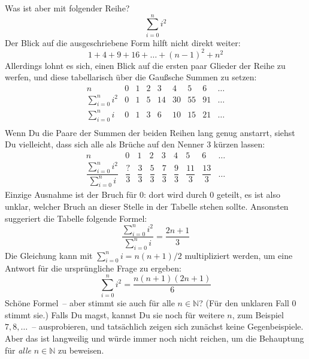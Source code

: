 Was ist aber mit folgender Reihe?
%
\[ \sum_{i=0}^n i^2 \]
%
Der Blick auf die ausgeschriebene Form hilft nicht direkt weiter:
%
\[ 1+4+9+16+\ldots+(n-1)^2+n^2 \]
%
Allerdings lohnt es sich, einen Blick auf die ersten paar Glieder der
Reihe zu werfen, und diese tabellarisch über die Gaußsche Summen zu
setzen:
%
\begin{displaymath}
  \begin{array}{crrrrrrrr}
    n & 0 & 1 & 2 & 3 & 4 & 5 & 6 & \ldots\\\hline
    \sum_{i=0}^n i^2 & 0 & 1 & 5 & 14 & 30 & 55 & 91 & \ldots\\
    \sum_{i=0}^n i   & 0 & 1 & 3 & 6 & 10 & 15 & 21 & \ldots\\
  \end{array}
\end{displaymath}
%
Wenn Du die Paare der Summen der beiden Reihen lang genug anstarrt, siehst
Du vielleicht, dass sich alle als Brüche auf den Nenner $3$ kürzen lassen:
%
\begin{displaymath}
  \begin{array}{crrrrrrrr}
    n & 0 & 1 & 2 & 3 & 4 & 5 & 6 & \ldots\\\hline
    \dfrac{\sum_{i=0}^n i^2}{\sum_{i=0}^n i} & \dfrac{?}{3} & \dfrac{3}{3} &
    \dfrac{5}{3} & \dfrac{7}{3} & \dfrac{9}{3} & \dfrac{11}{3} & \dfrac{13}{3} & \ldots
  \end{array}
\end{displaymath}
%
Einzige Ausnahme ist der Bruch für $0$: dort wird durch $0$ geteilt, es
ist also unklar, welcher Bruch an dieser Stelle in der Tabelle stehen
sollte.  Ansonsten suggeriert die Tabelle folgende Formel:
%
\begin{displaymath}
  \dfrac{\sum_{i=0}^n i^2}{\sum_{i=0}^n i} = \dfrac{2n+1}{3}
\end{displaymath}
%
Die Gleichung kann mit $\sum_{i=0}^n i = n(n+1)/2$ multipliziert werden, um eine
Antwort für die ursprüngliche Frage zu ergeben:
%
\begin{equation}
  \sum_{i=0}^n i^2 = \dfrac{n(n+1)(2n+1)}{6}
  \label{eq:squares-induction-prequel}
\end{equation}
%
Schöne Formel~-- aber stimmt sie auch für alle $n\in\mathbb{N}$?  (Für
den unklaren Fall $0$ stimmt sie.)  Falls Du
magst, kannst Du sie noch für weitere $n$, zum Beispiel $7, 8, \ldots$~-- ausprobieren,
und tatsächlich zeigen sich zunächst keine Gegenbeispiele.  Aber das
ist langweilig und würde immer noch nicht reichen, um die Behauptung
für \emph{alle} $n\in\mathbb{N}$ zu beweisen.

